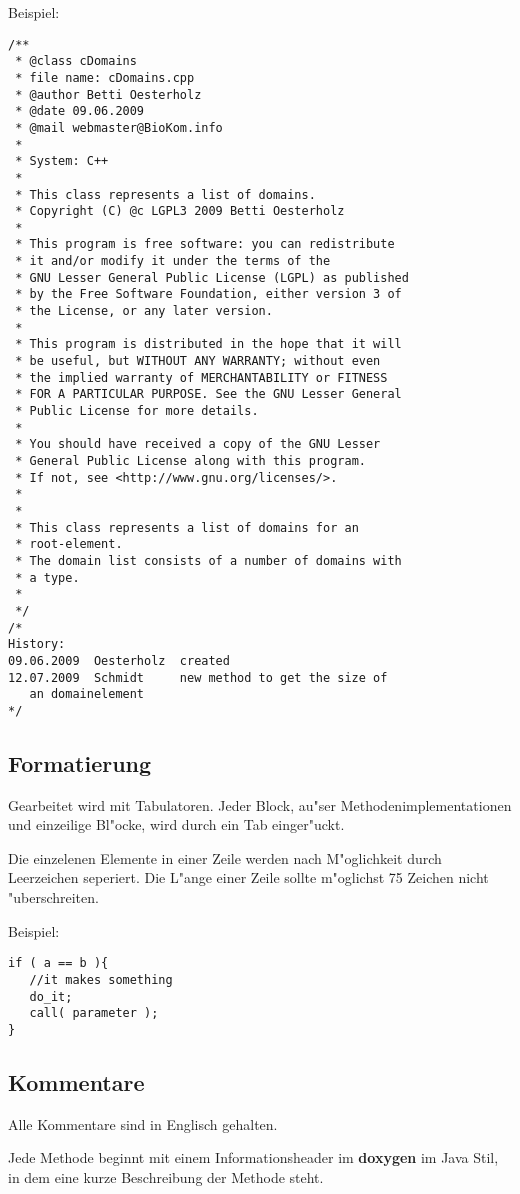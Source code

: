 \noindent
Beispiel:
\begin{verbatim}
/**
 * @class cDomains
 * file name: cDomains.cpp
 * @author Betti Oesterholz
 * @date 09.06.2009
 * @mail webmaster@BioKom.info
 *
 * System: C++
 *
 * This class represents a list of domains.
 * Copyright (C) @c LGPL3 2009 Betti Oesterholz
 *
 * This program is free software: you can redistribute
 * it and/or modify it under the terms of the
 * GNU Lesser General Public License (LGPL) as published
 * by the Free Software Foundation, either version 3 of
 * the License, or any later version.
 *
 * This program is distributed in the hope that it will
 * be useful, but WITHOUT ANY WARRANTY; without even
 * the implied warranty of MERCHANTABILITY or FITNESS
 * FOR A PARTICULAR PURPOSE. See the GNU Lesser General
 * Public License for more details.
 *
 * You should have received a copy of the GNU Lesser
 * General Public License along with this program.
 * If not, see <http://www.gnu.org/licenses/>.
 *
 *
 * This class represents a list of domains for an
 * root-element.
 * The domain list consists of a number of domains with
 * a type.
 *
 */
/*
History:
09.06.2009  Oesterholz  created
12.07.2009  Schmidt     new method to get the size of
   an domainelement
*/
\end{verbatim}

\subsection{Formatierung}

Gearbeitet wird mit Tabulatoren. Jeder Block, au"ser Methodenimplementationen und einzeilige Bl"ocke, wird durch ein Tab einger"uckt.

Die einzelenen Elemente in einer Zeile werden nach M"oglichkeit durch Leerzeichen seperiert. Die L"ange einer Zeile sollte m"oglichst 75 Zeichen nicht "uberschreiten.

\noindent
Beispiel:
\begin{verbatim}
if ( a == b ){
   //it makes something
   do_it;
   call( parameter );
}
\end{verbatim}

\subsection{Kommentare}

Alle Kommentare sind in Englisch gehalten.

Jede Methode beginnt mit einem Informationsheader im \textbf{doxygen} im Java Stil, in dem eine kurze Beschreibung der Methode steht.

